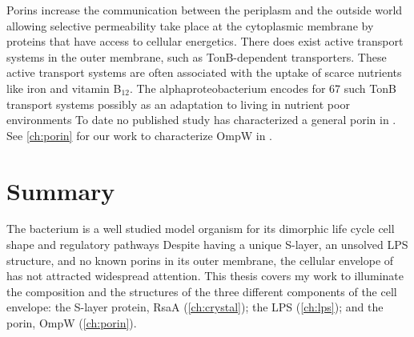 Porins increase the communication between the periplasm and the outside world allowing selective permeability take place at the cytoplasmic membrane by proteins that have access to
cellular energetics. There does exist active transport systems in the outer membrane, such as TonB-dependent transporters. These active transport systems are often associated with
the uptake of scarce nutrients like iron and vitamin B$_{12}$. The alphaproteobacterium \caulobacter{} encodes for 67 such TonB transport systems
possibly as an adaptation to living in nutrient poor environments To date no published study has characterized a general porin in \caulobacter{}. See
\cref{ch:porin} for our work to characterize OmpW in \caulobacter{}.

 \section{Summary}\label{sec:summary} The bacterium \caulobacter is a well studied model organism for its dimorphic life cycle cell
shape and regulatory pathways Despite having a unique \ac{S-layer}, an unsolved \ac{LPS} structure, and no known porins in
its outer membrane, the cellular envelope of \caulobacter has not attracted
widespread attention. This thesis covers my work to illuminate the composition and the structures of the
three different components of the \caulobacter cell envelope: the \ac{S-layer} protein, RsaA (\cref{ch:crystal}); the \ac{LPS} (\cref{ch:lps}); and the porin, OmpW
(\cref{ch:porin}).


